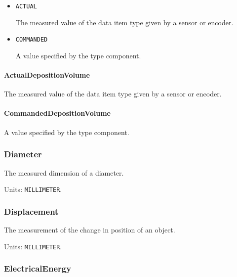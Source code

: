 \begin{itemize}

\item \texttt{ACTUAL}


The measured value of the data item type given by a sensor or encoder.

\item \texttt{COMMANDED}


A value specified by the  type component.


\end{itemize}

\paragraph{ActualDepositionVolume}\mbox{}
\label{sec:ActualDepositionVolume}


The measured value of the data item type given by a sensor or encoder.


\paragraph{CommandedDepositionVolume}\mbox{}
\label{sec:CommandedDepositionVolume}


A value specified by the  type component.


\subsubsection{Diameter}
\label{sec:Diameter}



The measured dimension of a diameter.


Units: \texttt{MILLIMETER}.

\subsubsection{Displacement}
\label{sec:Displacement}



The measurement of the change in position of an object.


Units: \texttt{MILLIMETER}.

\subsubsection{ElectricalEnergy}
\label{sec:ElectricalEnergy}



